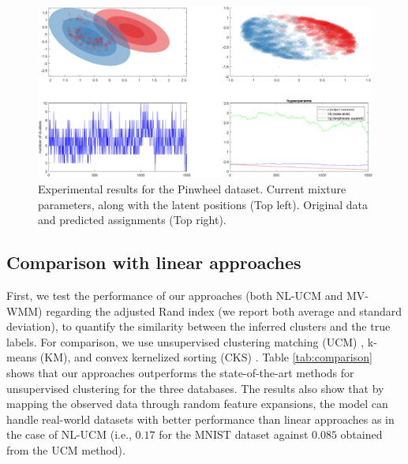 \documentclass[]{article}
\begin{document}
\begin{figure}[ht!]
	\centering
	\includegraphics[width=0.9\linewidth]{img/mvwmmPW2arms100N}
	\caption{Experimental results for the Pinwheel dataset. Current mixture parameters, along with the latent positions (Top left). Original data and predicted assignments (Top right). }
\end{figure}


\subsection{Comparison with linear approaches}

First, we test the performance of our approaches (both NL-UCM and MV-WMM) regarding the adjusted Rand index (we report both average and standard deviation), to quantify the similarity between the inferred clusters \cite{Iwata16} and the true labels. For comparison, we use unsupervised clustering matching (UCM) \cite{Iwata16}, k-means (KM), and convex kernelized sorting (CKS) \cite{Djuric12}. Table \ref{tab:comparison} shows that our approaches outperforms the state-of-the-art methods for unsupervised clustering for the three databases. The results also show that by mapping the observed data through  random feature expansions, the model can handle real-world datasets with better performance than linear approaches as in the case of NL-UCM (i.e., $0.17$ for the MNIST dataset against $0.085$ obtained from the UCM method). 
\end{document}
